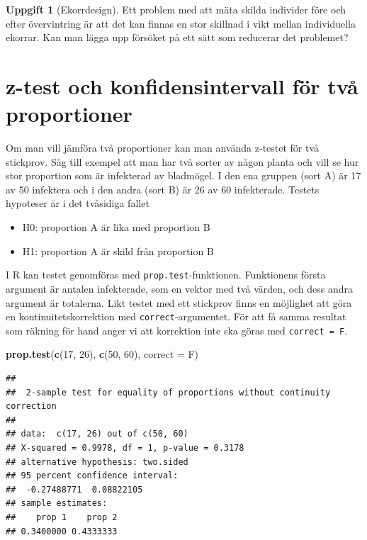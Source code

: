 \documentclass[
]{book}
\newenvironment{Shaded}{\begin{snugshade}}{\end{snugshade}}
\newcommand{\AttributeTok}[1]{\textcolor[rgb]{0.13,0.29,0.53}{#1}}
\newcommand{\DecValTok}[1]{\textcolor[rgb]{0.00,0.00,0.81}{#1}}
\newcommand{\FunctionTok}[1]{\textcolor[rgb]{0.13,0.29,0.53}{\textbf{#1}}}
\newcommand{\NormalTok}[1]{#1}
\providecommand{\tightlist}{%
  \setlength{\itemsep}{0pt}\setlength{\parskip}{0pt}}
\theoremstyle{definition}
\theoremstyle{definition}
\theoremstyle{definition}
\newtheorem{exercise}{Uppgift}[chapter]
\theoremstyle{definition}
\theoremstyle{remark}
\begin{document}
\begin{exercise}[Ekorrdesign]
Ett problem med att mäta skilda individer före och efter övervintring är att det kan finnas en stor skillnad i vikt mellan individuella ekorrar. Kan man lägga upp försöket på ett sätt som reducerar det problemet?
\end{exercise}

\section{z-test och konfidensintervall för två proportioner}\label{z-test-och-konfidensintervall-fuxf6r-tvuxe5-proportioner}

Om man vill jämföra två proportioner kan man använda z-testet för två stickprov. Säg till exempel att man har två sorter av någon planta och vill se hur stor proportion som är infekterad av bladmögel. I den ena gruppen (sort A) är 17 av 50 infektera och i den andra (sort B) är 26 av 60 infekterade. Testets hypoteser är i det tvåsidiga fallet

\begin{itemize}
\tightlist
\item
  H0: proportion A är lika med proportion B
\item
  H1: proportion A är skild från proportion B
\end{itemize}

I R kan testet genomföras med \texttt{prop.test}-funktionen. Funktionens första argument är antalen infekterade, som en vektor med två värden, och dess andra argument är totalerna. Likt testet med ett stickprov finns en möjlighet att göra en kontinuitetskorrektion med \texttt{correct}-argumentet. För att få samma resultat som räkning för hand anger vi att korrektion inte ska göras med \texttt{correct\ =\ F}.

\begin{Shaded}
\begin{Highlighting}[]
\FunctionTok{prop.test}\NormalTok{(}\FunctionTok{c}\NormalTok{(}\DecValTok{17}\NormalTok{, }\DecValTok{26}\NormalTok{), }\FunctionTok{c}\NormalTok{(}\DecValTok{50}\NormalTok{, }\DecValTok{60}\NormalTok{), }\AttributeTok{correct =}\NormalTok{ F)}
\end{Highlighting}
\end{Shaded}

\begin{verbatim}
## 
##  2-sample test for equality of proportions without continuity correction
## 
## data:  c(17, 26) out of c(50, 60)
## X-squared = 0.9978, df = 1, p-value = 0.3178
## alternative hypothesis: two.sided
## 95 percent confidence interval:
##  -0.27488771  0.08822105
## sample estimates:
##    prop 1    prop 2 
## 0.3400000 0.4333333
\end{verbatim}
\end{document}
